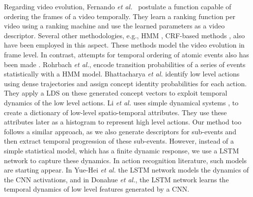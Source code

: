 Regarding video evolution, Fernando \textit{et al.}~\cite{fernando2015modeling} postulate
a function capable of ordering the frames of a video
temporally. They learn a ranking function per video using a ranking machine and use the learned parameters as
a video descriptor. Several other methodologies, e.g., HMM \cite{wang2011hidden, wu2014leveraging},
CRF-based methods \cite{song2013action}, also have been employed in this aspect. These methods model the video evolution in frame
level. In contrast, attempts for temporal ordering of atomic events also has been made \cite{rohrbach2012script, bhattacharya2014recognition}.
Rohrbach \textit{et al.}\cite{rohrbach2012script}, encode transition probabilities of a series of events statistically with a HMM model.
Bhattacharya \textit{et al.}\cite{bhattacharya2014recognition} identify low level actions using dense trajectories and assign concept identity
probabilities for each action. They apply a LDS on these generated concept vectors to exploit temporal
dynamics of the low level actions. Li \textit{et al.}\cite{li2013recognizing} uses simple dynamical systems \cite{jackson1992perspectives},
\cite{kailath1974view} to create a dictionary of low-level spatio-temporal attributes. They use these attributes
later as a histogram to represent high level actions. Our method too follows a similar approach,
as we also generate descriptors for sub-events and then extract temporal progression
of these sub-events. However, instead of a simple statistical model, which has a finite dynamic response,
we use a LSTM network \cite{hochreiter1997long} to capture these dynamics. In action recognition literature,
such models are starting appear. In Yue-Hei \textit{et al.}
\cite{yue2015beyond} the LSTM network models the dynamics of the CNN activations, and in Donahue \textit{et al.}\cite{donahue2015long},
the LSTM network learns the temporal dynamics of low level features generated by a CNN.

